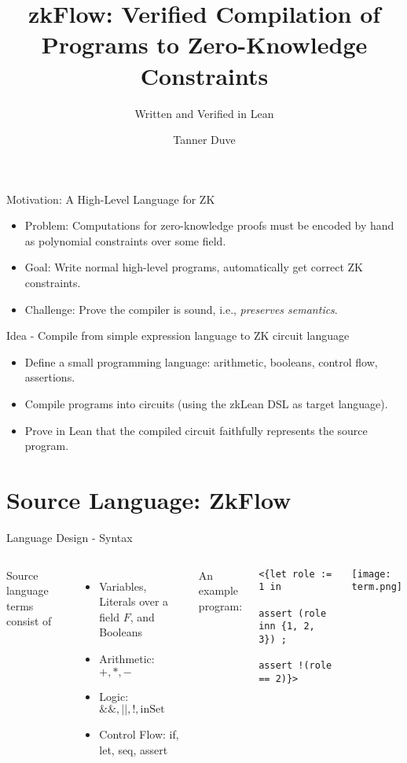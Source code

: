 \documentclass[aspectratio=169]{beamer}
\title{zkFlow: Verified Compilation of Programs to Zero-Knowledge Constraints}
\subtitle{Written and Verified in Lean}
\author{Tanner Duve}
\begin{document}
\maketitle

\begin{frame}{Motivation: A High-Level Language for ZK}
\begin{itemize}
    \item Problem: Computations for zero-knowledge proofs must be encoded by hand as polynomial constraints over some field.
    \item Goal: Write normal high-level programs, automatically get correct ZK constraints.
    \item Challenge: Prove the compiler is sound, i.e., \textit{preserves semantics}.
\end{itemize}
\end{frame}

\begin{frame}{Idea - Compile from simple expression language to ZK circuit language}
\begin{itemize}
    \item Define a small programming language: arithmetic, booleans, control flow, assertions.
    \item Compile programs into circuits (using the zkLean DSL as target language).
    \item Prove in Lean that the compiled circuit faithfully represents the source program.
\end{itemize}
\end{frame}

\section{Source Language: ZkFlow}

\begin{frame}[fragile]{Language Design - Syntax}
\begin{columns}
Source language terms consist of
\begin{itemize}
    \item Variables, Literals over a field $F$, and Booleans
    \item Arithmetic: $+, *, -$
    \item Logic: $\&\&, \mid\mid, !, \text{inSet}$
    \item Control Flow: if, let, seq, assert
\end{itemize}
An example program:
\begin{lstlisting}[language=lean]
<{let role := 1 in
        assert (role inn {1, 2, 3}) ;
        assert !(role == 2)}>
\end{lstlisting}

\vspace{-0.5 em}
\texttt{[image: term.png]}
\end{columns}
\end{frame}
\end{document}
